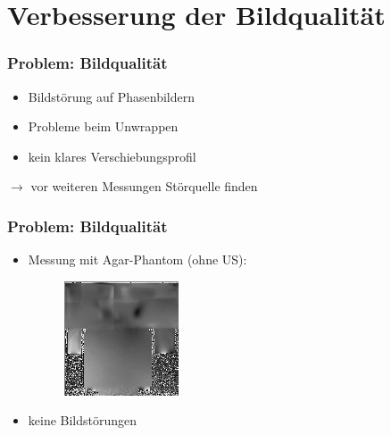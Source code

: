 \documentclass{beamer}
\begin{document}
    \section{Verbesserung der Bildqualität}

    
	\begin{frame}
		\frametitle{Problem: Bildqualität}
        \begin{itemize}
            \item 
                Bildstörung auf Phasenbildern
            \item
                Probleme beim Unwrappen
            \item
                kein klares Verschiebungsprofil
        \end{itemize}

        $\to$ vor weiteren Messungen Störquelle finden
	\end{frame}


    \begin{frame}
        \frametitle{Problem: Bildqualität}
        \begin{itemize}
            \item 
                Messung mit Agar-Phantom (ohne US):
                \begin{figure}
                    \centering
                    \includegraphics[width=.4\textwidth]{../Abbildungen/2014-12-11_10_1_phase.png}
                \end{figure}
            \item
                keine Bildstörungen
        \end{itemize}
    \end{frame}

\end{document}
